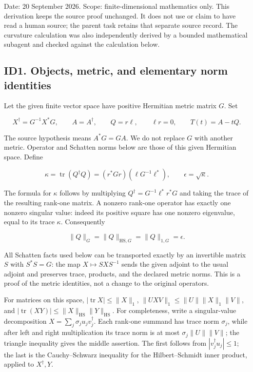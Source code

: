 \documentclass[11pt]{article}
\begin{document}
Date: 20 September 2026. Scope: finite-dimensional mathematics only. This derivation keeps the source proof unchanged. It does not use or claim to have read a human source; the parent task retains that separate source record. The curvature calculation was also independently derived by a bounded mathematical subagent and checked against the calculation below.

\subsection{ID1. Objects, metric, and elementary norm identities}\label{nhi:id1.-objects-metric-and-elementary-norm-identities}

Let the given finite vector space have positive Hermitian metric matrix \(G\). Set

\[
X^\dagger=G^{-1}X^*G,\qquad
A=A^\dagger,\qquad Q=r\ell,\qquad \ell r=0,\qquad T(t)=A-tQ.
\]

The source hypothesis means \(A^*G=GA\). We do not replace \(G\) with another metric. Operator and Schatten norms below are those of this given Hermitian space. Define

\[
\kappa=\operatorname{tr}(Q^\dagger Q)
=(r^*Gr)(\ell G^{-1}\ell^*),\qquad \epsilon=\sqrt\kappa.
\]

The formula for \(\kappa\) follows by multiplying \(Q^\dagger=G^{-1}\ell^*r^*G\) and taking the trace of the resulting rank-one matrix. A nonzero rank-one operator has exactly one nonzero singular value: indeed its positive square has one nonzero eigenvalue, equal to its trace \(\kappa\). Consequently

\[
\|Q\|_G=\|Q\|_{\mathrm{HS},G}=\|Q\|_{1,G}=\epsilon.
\]

All Schatten facts used below can be transported exactly by an invertible matrix \(S\) with \(S^*S=G\): the map \(X\mapsto SXS^{-1}\) sends the given adjoint to the usual adjoint and preserves trace, products, and the declared metric norms. This is a proof of the metric identities, not a change to the original operators.

For matrices on this space, \(|\operatorname{tr}X|\le\|X\|_1\), \(\|UXV\|_1\le\|U\|\|X\|_1\|V\|\), and \(|\operatorname{tr}(XY)|\le\|X\|_{\mathrm{HS}}\|Y\|_{\mathrm{HS}}\). For completeness, write a singular-value decomposition \(X=\sum_j\sigma_j u_jv_j^\dagger\). Each rank-one summand has trace norm \(\sigma_j\), while after left and right multiplication its trace norm is at most \(\sigma_j\|U\|\|V\|\); the triangle inequality gives the middle assertion. The first follows from \(|v_j^\dagger u_j|\le1\); the last is the Cauchy--Schwarz inequality for the Hilbert--Schmidt inner product, applied to \(X^\dagger,Y\).
\end{document}

